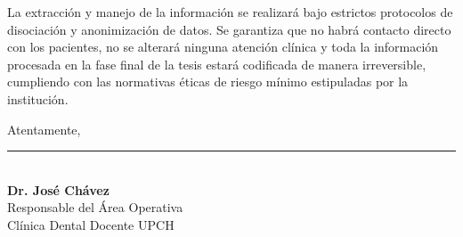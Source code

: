 \documentclass[11pt,a4paper]{article}
\begin{document}
\vspace{0.3cm}

\noindent La extracción y manejo de la información se realizará bajo estrictos protocolos de disociación y anonimización de datos. Se garantiza que no habrá contacto directo con los pacientes, no se alterará ninguna atención clínica y toda la información procesada en la fase final de la tesis estará codificada de manera irreversible, cumpliendo con las normativas éticas de riesgo mínimo estipuladas por la institución.

\vspace{0.5cm}

\noindent Atentamente,

\vspace{2cm}

\noindent \rule{7cm}{0.4pt}\\
\textbf{Dr. José Chávez}\\
Responsable del Área Operativa\\
Clínica Dental Docente UPCH
\end{document}
